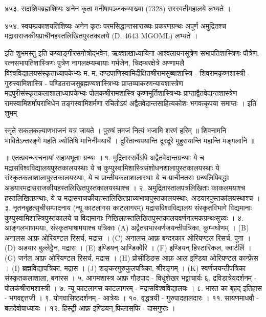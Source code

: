 ४५३. सदाशिवब्रह्मशिष्यः
अनेन कृता मनीषापञ्जकव्याख्या (7328) सरस्वतीमहालये लभ्यते ।

४५४.
स्वयम्प्रकाशयतिशिष्यः
अनेन कृतः परमसिद्धान्तसाराख्यः प्रकरणग्रन्थः अपूर्ण अमुद्रितश्च मद्रासराजकीयप्राचीनहस्तलिखितपुस्तकालये (D. 4643 MGOML) लभ्यते ।

इति शुभमस्तु
इति कप्याङ्गीरसगोत्रोद्भवेन, ऋक्शाखाध्यायिना आश्वलायनसूत्रेण सभापतिशास्त्रिणः पौत्रेण, रत्नसभापतिशास्त्रिणः पुत्रेण नागलक्ष्म्यम्बायाः गर्भजेन, चिदम्बरक्षेत्रे अण्णामलै विश्वविद्यालयसंस्कृताध्यापकेभ्यः म. म. दण्डपाणिस्वामिदीक्षितश्रीरामसुब्बाशास्त्रि - शिवरामकृष्णशास्त्री - गुरुस्वामिशास्त्रि - पण्डितराजसुब्रह्मण्यशास्त्रिभ्यः प्राप्तव्याकरणन्यायशास्त्रेण मद्रपुरीसंस्कृतकलाशालाध्यापकेभ्यः पोलकश्रीरामशास्त्रि कृष्णमूर्तिशास्त्रिभ्यः प्राप्ताद्वैतवेदान्तशास्त्रेण रामस्वामिशर्मापराभिधेन तङ्गस्वामिशर्मणा रचितोऽयं अद्वैतवेदान्तसाहित्यकोशः भगवत्कृपया समाप्तः ।
इति शुभम् 

स्मृते सकलकल्याणभाजनं यत्र जायते ।
पुरुषं तमजं नित्यं भजामि शरणं हरिम् ॥
शिवनामनि भावितेऽन्तरङ्गे महति ज्योतिषि मानिनीमयार्धे ।
दुरितान्यपयान्ति दूरदूरे मुहुरायान्ति महान्ति मङ्गलानि ॥

॥ एतत्प्रबन्धरचनायां सहायभूताः ग्रन्थः ॥
१. मुद्रितास्सर्वेऽपि अद्वैतवेदान्तग्रन्थाः ये च मद्रासविश्वविद्यालयपुस्तकालयस्थाः ये च कुप्पुस्वामिशास्त्रिसंशोधनशालापुस्तकालयस्थाः ये संस्कृतकलाशालापुस्तकालयस्थाः, ये च प्रान्तीयकलाशालास्थाः ये च प्राचीनतराः ग्रन्थलिपिबद्धाः अडयारमद्रासराजकीयहस्तलिखितपुस्तकालयस्थाश्च ।
२. अमुद्रितास्तालपत्रलिखिताः काकलमयाश्च हस्तलिखितग्रन्थाः, ये च मद्रासराजकीयहस्तलिखितप्राच्यभाषापुस्तकालयस्थाः, अडयारपुस्तकांलयस्थाश्च ।
३. नृतनबृहत्सृचीसम्पादनाय (न्यू काटलागस काटलागरम्) मद्रासविश्वविद्यालय संस्कृतविभागे विद्यमानाः कुप्पुस्वामिशास्त्रिपुस्तकालये च विद्यमानाः निखिलहस्तलिखितपुस्तकालयवर्णनात्मकग्रन्थःसूच्यः ।
४. आङ्गलभाषामयाः, संस्कृतभाषामयाश्च पत्रिकाः
(A) अद्वैतसभास्वर्णजयन्तीपत्रिका, कुम्भघोणम् ।
(B) अनालस आफ़ ओरियण्टल रिसर्च, मद्रास ।
(C) अनालस आफ़ बन्दरकार ओरियण्टल रिसर्च, पूना ।
(D) अडयार बुल्लेट्टैन, मद्रास ।
(E) इण्डियन् आण्डिक्वैरि ।
(F) इण्डियन् हिस्टारिकल, क्वार्टर्लि ।
(G) जर्नल आफ़ ओरियण्टल रिसर्च, मद्रास ।
(H) प्रोसीडिङस आफ़ आल इण्डिया ओरियण्टल कान्फ्रेंस ।
(I) ब्रह्मविद्यापत्रिका, मद्रास ।
(J) शङ्करगुरुकुलपत्रिका, श्रीरङ्गम् ।
(K) स्वर्णजयन्तीपत्रिका संस्कृतकलाशाला, बनारस ।
५. आगमशास्त्र आफ़ गौडपाद - विधुशेखर भट्टाचार्यः
६. द्रविडात्रेयदर्शनम् - पोलकंश्रीरामशास्त्री ।
७. न्यू काटलागस काटलागरम् - मद्रासविश्वविद्यालयः ।
८. भारत का बृहद् इतिहास - भगवद्दत्तजी ।
९. योगवासिष्ठदर्शनम् - आत्रेयः ।
१०. वृद्धत्रयी - गुरुपादहालदारः ।
११. सायणमाधवौ - बलदेवोपाध्यायः ।
१२. हिस्ट्री आफ़ इण्डियन् फि़लासफि़ - दासगुप्तः ।
